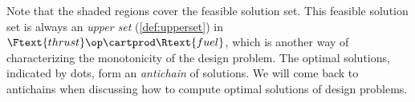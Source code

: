 \begin{example}
    Note that the shaded regions cover the feasible solution set.
    This feasible solution set is always an \emph{upper set} (\cref{def:upperset}) in~$\Ftext{thrust}\op \cartprod \Rtext{fuel}$, which is another way of characterizing the monotonicity of the design problem.
    The optimal solutions, indicated by dots, form an \emph{antichain} of solutions.
    We will come back to antichains when discussing how to compute optimal solutions of design problems.

\end{example}

%
%
%
